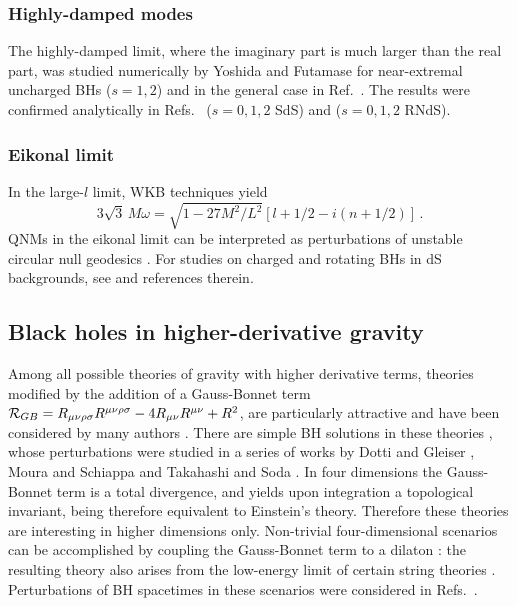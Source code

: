 \documentclass[]{iopart}
\def\be{\begin{equation}}
\def\ee{\end{equation}}
\begin{document}
\subsubsection*{Highly-damped modes} The highly-damped limit, where the
imaginary part is much larger than the real part, was studied numerically by
Yoshida and Futamase \cite{Yoshida:2003zz} for near-extremal uncharged BHs
($s=1,2$) and in the general case in
Ref.~\cite{Choudhury:2003wd,Konoplya:2004uk}. The results were confirmed
analytically in Refs.~\cite{Cardoso:2004up} ($s=0,1,2$ SdS) and
\cite{Natario:2004jd} ($s=0,1,2$ RNdS).

\subsubsection*{Eikonal limit} In the large-$l$ limit, WKB techniques
\cite{barretozworski,Zhidenko:2003wq} yield
%
\be
3\sqrt{3}\,M\omega=\sqrt{1-27M^2/L^2}\left [l+1/2-i(n+1/2)\right ]\,.
\ee 
%
QNMs in the eikonal limit can be interpreted as perturbations of unstable
circular null geodesics \cite{Cardoso:2008bp}.  For studies on charged and
rotating BHs in dS backgrounds, see \cite{Konoplya:2007zx} and references
therein.

\subsection{Black holes in higher-derivative gravity}

Among all possible theories of gravity with higher derivative terms, theories
modified by the addition of a Gauss-Bonnet term
%
${\cal R}_{GB}=R_{\mu\nu\rho\sigma}R^{\mu\nu\rho\sigma}-4R_{\mu\nu}R^{\mu\nu}+R^2$,
%
are particularly attractive and have been considered by many authors
\cite{Moura:2006pz}. There are simple BH solutions in these theories
\cite{Wheeler:1985nh,Wheeler:1985qd,Boulware:1985wk,Kanti:1995vq,
  Torii:1996yi,Alexeev:1996vs,Pani:2009wy,Guo:2008hf,Guo:2008eq,Ohta:2009tb},
whose perturbations were studied in a series of works by Dotti and Gleiser
\cite{Dotti:2004sh,Dotti:2005sq,Gleiser:2005ra}, Moura and Schiappa
\cite{Moura:2006pz} and Takahashi and Soda \cite{Takahashi:2009dz}. In four dimensions the
Gauss-Bonnet term is a total divergence, and yields upon integration a
topological invariant, being therefore equivalent to Einstein's theory.
Therefore these theories are interesting in higher dimensions
only. Non-trivial four-dimensional scenarios can be accomplished by coupling
the Gauss-Bonnet term to a dilaton \cite{Pani:2009wy}: the resulting theory
also arises from the low-energy limit of certain string theories
\cite{Moura:2006pz}. Perturbations of BH spacetimes in these scenarios were
considered in Refs.~\cite{Pani:2009wy,Kanti:1997br,Torii:1996yi}.
\end{document}

